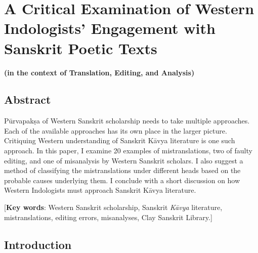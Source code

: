 \chapter[A Critical Examination of Western Indologists’...]{A Critical Examination of Western Indologists’ Engagement with Sanskrit Poetic Texts}\label{chapter\thechapter:begin}

\begin{center}
{\bf (in the context of Translation, Editing, and Analysis)}
\end{center}


\section*{Abstract} 

Pūrvapakṣa of Western Sanskrit scholarship needs to take multiple approaches. Each of the available approaches has its own place in the larger picture. Critiquing Western understanding of Sanskrit Kāvya literature is one such approach. In this paper, I examine 20 examples of mistranslations, two of faulty editing, and one of misanalysis by Western Sanskrit scholars. I also suggest a method of classifying the mistranslations under different heads based on the probable causes underlying them. I conclude with a short discussion on how Western Indologists must approach Sanskrit Kāvya literature. 

\medskip
\noindent
{[{\bf Key words}: 
Western Sanskrit scholarship, Sanskrit \textsl{Kāvya} literature, mistranslations, editing errors, misanalyses, Clay Sanskrit Library.]} 


\section*{Introduction}  

